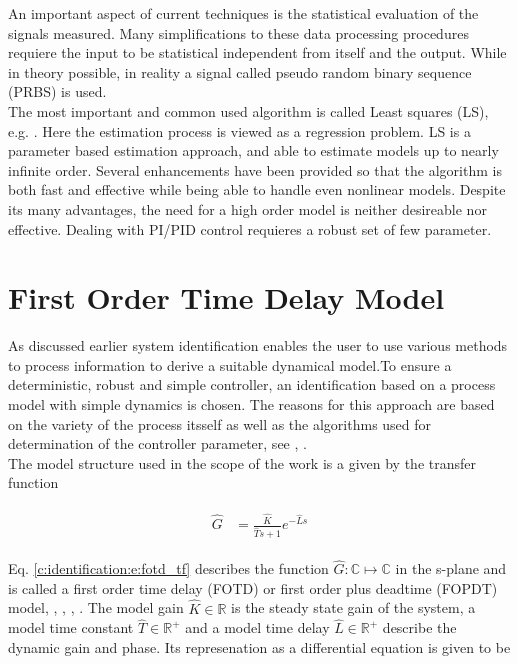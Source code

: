 An important aspect of current techniques is the statistical evaluation of the signals measured. Many simplifications to these data processing procedures requiere the input to be statistical independent from itself and the output. While in theory possible, in reality a signal called pseudo random binary sequence (PRBS) is used.\\

The most important and common used algorithm is called Least squares (LS), e.g. \cite[p.62 ff.]{Keesman2011}. Here the estimation process is viewed as a regression problem. LS is a parameter based estimation approach, and able to estimate models up to nearly infinite order. Several enhancements have been provided so that the algorithm is both fast and effective while being able to handle even nonlinear models. Despite its many advantages, the need for a high order model is neither desireable nor effective. Dealing with PI/PID control requieres a robust set of few parameter.\\

\section{First Order Time Delay Model}%
\label{c:identification:s:fotd}

As discussed earlier system identification enables the user to use various methods to process information to derive a suitable dynamical model.To ensure a deterministic, robust and simple controller, an identification based on a process model with simple dynamics is chosen. The reasons for this approach are based on the variety of the process itsself as well as the algorithms used for determination of the controller parameter, see \cite{Astrom1995}, \cite{Astrom2006}.\\

The model structure used in the scope of the work is a given by the transfer function

\begin{align}
\begin{split}
\hat{G} &= \frac{\hat{K}}{\hat{T}s+1}e^{-\hat{L}s}
\end{split}
\label{c:identification:e:fotd_tf}
\end{align}

Eq. \ref{c:identification:e:fotd_tf} describes the function $\hat{G}: \mathbb{C} \mapsto \mathbb{C}$ in the s-plane and is called a first order time delay (FOTD) or first order plus deadtime (FOPDT) model, \cite[p.16]{Astrom1995}, \cite[p.20, p.26]{Astrom2006}, \cite{Fedele2009a}, \cite{Bi1999}.
The model gain $\hat{K} \in \mathbb{R}$ is the steady state gain of the system, a model time constant $\hat{T} \in \mathbb{R}^+$ and a model time delay $\hat{L} \in \mathbb{R}^+$ describe the dynamic gain and phase. Its represenation as a differential equation is given to be

